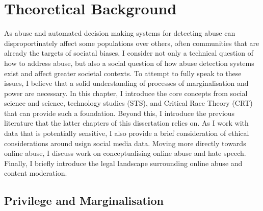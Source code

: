 

\chapter{Theoretical Background}\label{chap:socialscience}
As abuse and automated decision making systems for detecting abuse can disproportinately affect some populations over others, often communities that are already the targets of sociatal biases, I consider not only a technical question of how to address abuse, but also a social question of how abuse detection systems exist and affect greater societal contexts. To attempt to fully speak to these issues, I believe that a solid understanding of processes of marginalisation and power are necessary. In this chapter, I introduce the core concepts from social science and science, technology studies (STS), and Critical Race Theory (CRT) that can provide such a foundation. Beyond this, I introduce the previous literature that the latter chapters of this dissertation relies on. As I work with data that is potentially sensitive, I also provide a brief consideration of ethical considerations around usign social media data. Moving more directly towards online abuse, I discuss work on conceptualising online abuse and hate speech. Finally, I briefly introduce the legal landscape surrounding online abuse and content moderation.


\section{Privilege and Marginalisation}

